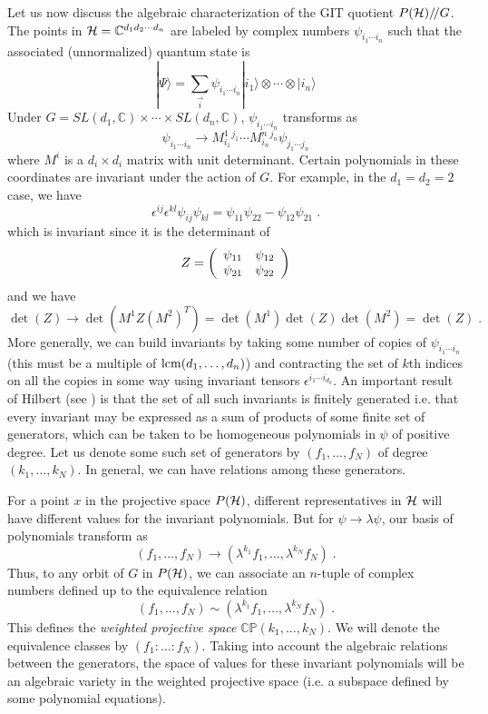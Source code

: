 \documentclass[12pt]{article}
\theoremstyle{definition}
\newcommand{\be}{\begin{equation}}
\newcommand{\ee}{\end{equation}}
\newcommand{\ba}{\begin{array}}
\newcommand{\ea}{\end{array}}
\newcommand{\GITquot}{/\!/}
\begin{document}
Let us now discuss the algebraic characterization of the GIT quotient $P({\cal H})\GITquot G$. The points in ${\cal H} = \mathbb{C}^{d_1 d_2 \cdots d_n}$ are labeled by complex numbers $\psi_{i_{1} \cdots i_n}$ such that the associated (unnormalized) quantum state is
\be
|\Psi \rangle = \sum_{\vec{i}} \psi_{i_1 \cdots i_n} |i_1 \rangle \otimes \cdots \otimes |i_n \rangle
\ee
Under $G = SL(d_1,\mathbb{C}) \times \cdots \times SL(d_n,\mathbb{C})$, $\psi_{i_{1} \cdots i_n}$ transforms as
\be
\psi_{i_1 \cdots i_n} \to M^1_{i_1} {}^{j_1} \cdots M^n_{i_n} {}^{j_n} \psi_{j_1 \cdots j_n}
\ee
where $M^i$ is a $d_i \times d_i$ matrix with unit determinant. Certain polynomials in these coordinates are invariant under the action of $G$. For example, in the $d_1 = d_2 = 2$ case, we have
\be
\epsilon^{ij} \epsilon^{kl} \psi_{ij} \psi_{kl} = \psi_{11} \psi_{22} - \psi_{12} \psi_{21} \; .
\ee
which is invariant since it is the determinant of
\be
Z = \left( \ba{cc} \psi_{11} & \psi_{12} \cr \psi_{21} & \psi_{22} \ea \right)
\ee
and we have
\be
\det(Z) \to \det(M^1 Z (M^2)^T) = \det(M^1) \det(Z) \det(M^2) = \det(Z) \; .
\ee
More generally, we can build invariants by taking some number  of copies of $\psi_{i_1 \cdots i_n}$ (this must be a multiple of ${\rm lcm}(d_1, \dots, d_n)$) and contracting the set of $k$th indices on all the copies in some way using invariant tensors $\epsilon^{i_1 \cdots i_{d_k}}$. An important result of Hilbert (see \cite{mfk,dc}) is that the set of all such invariants is finitely generated i.e. that every invariant may be expressed as a sum of products of some finite set of generators, which can be taken to be homogeneous polynomials in $\psi$ of positive degree. Let us denote some such set of generators by $(f_1,\dots,f_N)$ of degree $(k_1, \dots, k_N)$. In general, we can have relations among these generators.

For a point $x$ in the projective space $P({\cal H})$, different representatives in ${\cal H}$ will have different values for the invariant polynomials. But for $\psi \to \lambda \psi$, our basis of polynomials transform as
\be
(f_1,\dots,f_N) \to  (\lambda^{k_1} f_1,\dots, \lambda^{k_N} f_N) \; .
\ee
Thus, to any orbit of $G$ in $P({\cal H})$, we can associate an $n$-tuple of complex numbers defined up to the equivalence relation
\be
(f_1,\dots,f_N) \sim  (\lambda^{k_1} f_1,\dots, \lambda^{k_N} f_N) \; .
\ee
This defines the {\it  weighted projective space} $\mathbb{C P}(k_1,\dots,k_N)$. We will denote the equivalence classes by $(f_1:\dots:f_N)$. Taking into account the algebraic relations between the generators, the space of values for these invariant polynomials will be an algebraic variety in the weighted projective space (i.e. a subspace defined by some polynomial equations).
\end{document}
